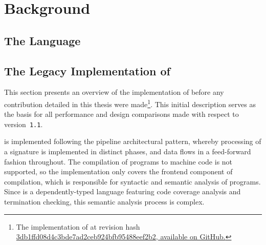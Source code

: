 \chapter{Background}

\section{The \Beluga Language}


\section{The Legacy Implementation of \Beluga} \label{section:beluga-implementation}

This section presents an overview of the implementation of \Beluga before any contribution detailed in this thesis were made\footnote{The implementation of \Beluga at revision hash \href{https://github.com/Beluga-lang/Beluga/tree/3db1ffd08d4c3bde7ad2ceb924bfb95488eef2b2}{3db1ffd08d4c3bde7ad2ceb924bfb95488eef2b2, available on GitHub.}}.
This initial description serves as the basis for all performance and design comparisons made with respect to \Beluga version~\texttt{1.1}.

\Beluga is implemented following the pipeline architectural pattern, whereby processing of a \Beluga signature is implemented in distinct phases, and data flows in a feed-forward fashion throughout.
The compilation of \Beluga programs to machine code is not supported, so the implementation only covers the frontend component of compilation, which is responsible for syntactic and semantic analysis of programs.
Since \Beluga is a dependently-typed language featuring code coverage analysis and termination checking, this semantic analysis process is complex.

